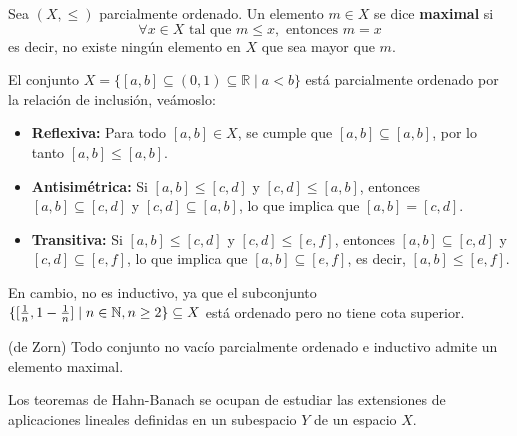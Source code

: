 \begin{definicion}
    Sea $(X, \leq)$ parcialmente ordenado. Un elemento $m \in X$ se dice \textbf{maximal} si 
    \begin{equation*}
        \forall x \in X \text{ tal que } m \leq x, \text{ entonces } m = x
    \end{equation*}
    es decir, no existe ningún elemento en $X$ que sea mayor que $m$.
\end{definicion}

\begin{ejemplo}
    El conjunto $X = \{ [a, b] \subseteq (0, 1) \subseteq \mathbb{R} \mid a < b \}$ está parcialmente ordenado por la relación de inclusión, veámoslo:
    \begin{itemize}
        \item[i)] \textbf{Reflexiva:} Para todo $[a, b] \in X$, se cumple que $[a, b] \subseteq [a, b]$, por lo tanto $[a, b] \leq [a, b]$.
        \item[ii)] \textbf{Antisimétrica:} Si $[a, b] \leq [c, d]$ y $[c, d] \leq [a, b]$, entonces $[a, b] \subseteq [c, d]$ y $[c, d] \subseteq [a, b]$, lo que implica que $[a, b] = [c, d]$.
        \item[iii)] \textbf{Transitiva:} Si $[a, b] \leq [c, d]$ y $[c, d] \leq [e, f]$, entonces $[a, b] \subseteq [c, d]$ y $[c, d] \subseteq [e, f]$, lo que implica que $[a, b] \subseteq [e, f]$, es decir, $[a, b] \leq [e, f]$.
    \end{itemize}
    En cambio, no es inductivo, ya que el subconjunto $\{ [\frac{1}{n}, 1 - \frac{1}{n} ] \mid n \in \mathbb{N}, n\geq 2 \} \subseteq X$ está ordenado pero no tiene cota superior.
\end{ejemplo}

\begin{lema}(de Zorn)
    Todo conjunto no vacío parcialmente ordenado e inductivo admite un elemento maximal.
\end{lema}


\noindent Los teoremas de Hahn-Banach se ocupan de estudiar las extensiones de aplicaciones lineales definidas en un subespacio $Y$ de un espacio $X$.

